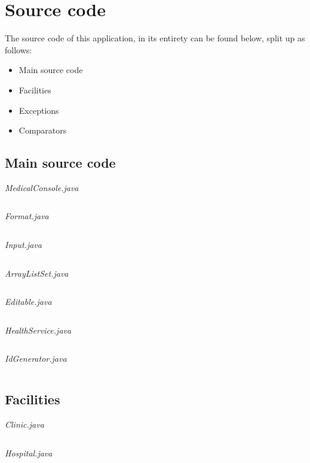 \documentclass{article}
\begin{document}
	\section{Source code}\label{sec:code} %
	The source code of this application, in its entirety can be found below, split up as follows: 
	\begin{itemize}
		\item Main source code 
		\item Facilities
		\item Exceptions
		\item Comparators
	\end{itemize}

	\subsection{Main source code}\label{sub:main_source_code} %
	\textit{MedicalConsole.java}
	\inputminted{java}{src/main/java/com/yvesstraten/medicalconsole/MedicalConsole.java}

	\textit{Format.java}
	\inputminted{java}{src/main/java/com/yvesstraten/medicalconsole/Format.java}

	\textit{Input.java}
	\inputminted{java}{src/main/java/com/yvesstraten/medicalconsole/Input.java}

	\textit{ArrayListSet.java}
	\inputminted{java}{./src/main/java/com/yvesstraten/medicalconsole/ArrayListSet.java}

	\newpage 

	\textit{Editable.java}\label{Editable}
	\inputminted{java}{src/main/java/com/yvesstraten/medicalconsole/Editable.java}

	\textit{HealthService.java}
	\inputminted{java}{src/main/java/com/yvesstraten/medicalconsole/HealthService.java}

	\textit{IdGenerator.java}
	\inputminted{java}{src/main/java/com/yvesstraten/medicalconsole/IdGenerator.java}

	\subsection{Facilities}\label{sub:facilities} %
	\textit{Clinic.java}
	\inputminted{java}{src/main/java/com/yvesstraten/medicalconsole/facilities/Clinic.java}

	\textit{Hospital.java}
	\inputminted{java}{src/main/java/com/yvesstraten/medicalconsole/facilities/Hospital.java}
\end{document}

